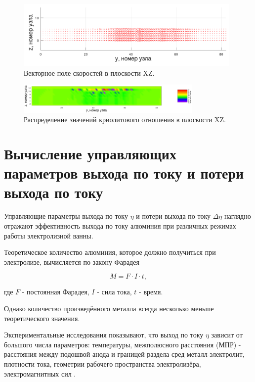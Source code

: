 \documentclass{article}
\begin{document}
\begin{figure}[H]
    \centering
    \includegraphics[width=110mm]{veloyz_art.png}
    \caption{Векторное поле скоростей в плоскости XZ.}
    \label{fig:3dxyvelo3} 
\end{figure}

\begin{figure}[H]
    \centering
    \includegraphics[width=90mm]{3d yz cr.png}
    \caption{Распределение значений криолитового отношения в плоскости XZ.}
    \label{fig:3dxycr3} 
\end{figure}

\section{Вычисление управляющих параметров выхода по току и потери выхода по току}

Управляющие параметры выхода по току $\eta$ и потери выхода по току $\Delta \eta$ наглядно отражают эффективность выхода по току алюминия при различных режимах работы электролизной ванны.

Теоретическое количество алюминия, которое должно получиться при электролизе, вычисляется по закону Фарадея

\begin{equation}\label{eq:farad}
M = F \cdot I \cdot t,
\end{equation}

где $F$ - постоянная Фарадея, $I$ - сила тока, $t$ - время.

Однако количество произведённого металла всегда несколько меньше теоретического значения.

Экспериментальные исследования показывают, что выход по току $\eta$ зависит от большого числа параметров: температуры, межполюсного расстояния (МПР) - расстояния между подошвой анода и границей раздела сред металл-электролит, плотности тока, геометрии рабочего пространства электролизёра, электромагнитных сил \cite{litlink:bibliogr}.
\end{document}

